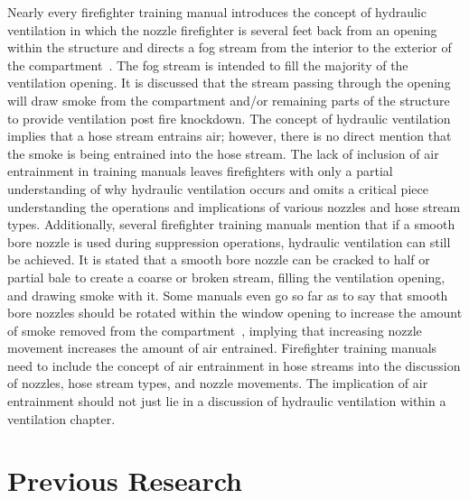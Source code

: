 \documentclass[12pt,oneside]{book}
\begin{document}
Nearly every firefighter training manual introduces the concept of hydraulic ventilation in which the nozzle firefighter is several feet back from an opening within the structure and directs a fog stream from the interior to the exterior of the compartment~\cite{Essentials6,FEHandbook}. The fog stream is intended to fill the majority of the ventilation opening. It is discussed that the stream passing through the opening will draw smoke from the compartment and/or remaining parts of the structure to provide ventilation post fire knockdown. The concept of hydraulic ventilation implies that a hose stream entrains air; however, there is no direct mention that the smoke is being entrained into the hose stream. The lack of inclusion of air entrainment in training manuals leaves firefighters with only a partial understanding of why hydraulic ventilation occurs and omits a critical piece understanding the operations and implications of various nozzles and hose stream types. Additionally, several firefighter training manuals mention that if a smooth bore nozzle is used during suppression operations, hydraulic ventilation can still be achieved. It is stated that a smooth bore nozzle can be cracked to half or partial bale to create a coarse or broken stream, filling the ventilation opening, and drawing smoke with it. Some manuals even go so far as to say that smooth bore nozzles should be rotated within the window opening to increase the amount of smoke removed from the compartment~\cite{FEHandbook}, implying that increasing nozzle movement increases the amount of air entrained. Firefighter training manuals need to include the concept of air entrainment in hose streams into the discussion of nozzles, hose stream types, and nozzle movements. The implication of air entrainment should not just lie in a discussion of hydraulic ventilation within a ventilation chapter.

\section{Previous Research}
\end{document}
